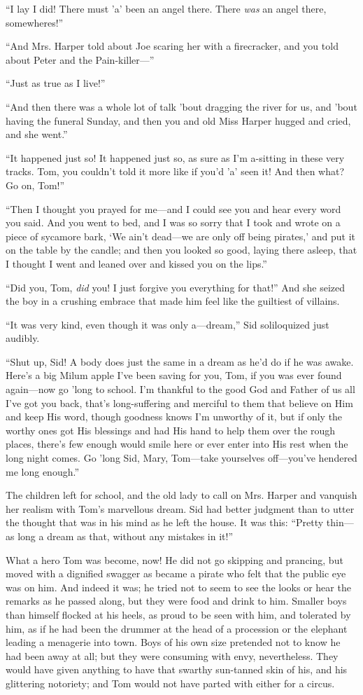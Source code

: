 \documentclass{book}
\begin{document}
“I lay I did! There must ’a’ been an angel there. There \emph{was} an angel there, somewheres!”

“And Mrs. Harper told about Joe scaring her with a firecracker, and you told about Peter and the Pain-killer—”

“Just as true as I live!”

“And then there was a whole lot of talk ’bout dragging the river for us, and ’bout having the funeral Sunday, and then you and old Miss Harper hugged and cried, and she went.”

“It happened just so! It happened just so, as sure as I’m a-sitting in these very tracks. Tom, you couldn’t told it more like if you’d ’a’ seen it! And then what? Go on, Tom!”

“Then I thought you prayed for me—and I could see you and hear every word you said. And you went to bed, and I was so sorry that I took and wrote on a piece of sycamore bark, ‘We ain’t dead—we are only off being pirates,’ and put it on the table by the candle; and then you looked so good, laying there asleep, that I thought I went and leaned over and kissed you on the lips.”

“Did you, Tom, \emph{did} you! I just forgive you everything for that!” And she seized the boy in a crushing embrace that made him feel like the guiltiest of villains.

“It was very kind, even though it was only a—dream,” Sid soliloquized just audibly.

“Shut up, Sid! A body does just the same in a dream as he’d do if he was awake. Here’s a big Milum apple I’ve been saving for you, Tom, if you was ever found again—now go ’long to school. I’m thankful to the good God and Father of us all I’ve got you back, that’s long-suffering and merciful to them that believe on Him and keep His word, though goodness knows I’m unworthy of it, but if only the worthy ones got His blessings and had His hand to help them over the rough places, there’s few enough would smile here or ever enter into His rest when the long night comes. Go ’long Sid, Mary, Tom—take yourselves off—you’ve hendered me long enough.”

The children left for school, and the old lady to call on Mrs. Harper and vanquish her realism with Tom’s marvellous dream. Sid had better judgment than to utter the thought that was in his mind as he left the house. It was this: “Pretty thin—as long a dream as that, without any mistakes in it!”

What a hero Tom was become, now! He did not go skipping and prancing, but moved with a dignified swagger as became a pirate who felt that the public eye was on him. And indeed it was; he tried not to seem to see the looks or hear the remarks as he passed along, but they were food and drink to him. Smaller boys than himself flocked at his heels, as proud to be seen with him, and tolerated by him, as if he had been the drummer at the head of a procession or the elephant leading a menagerie into town. Boys of his own size pretended not to know he had been away at all; but they were consuming with envy, nevertheless. They would have given anything to have that swarthy sun-tanned skin of his, and his glittering notoriety; and Tom would not have parted with either for a circus.
\end{document}

